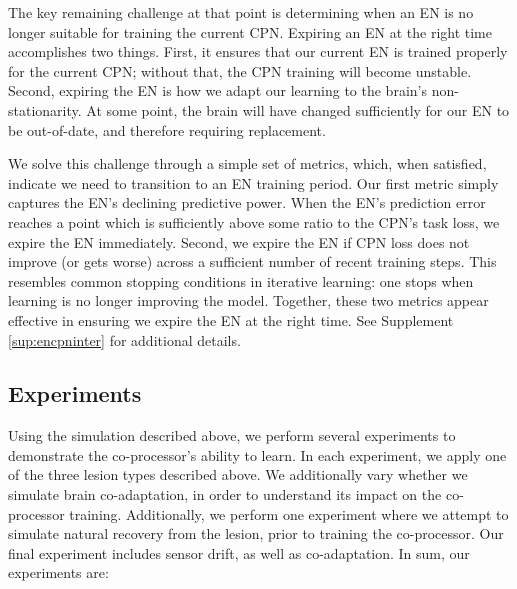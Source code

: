 \documentclass[12pt]{iopart}
\begin{document}
The key remaining challenge at that point is determining when an EN is no longer
suitable for training the current CPN. Expiring an EN at the right time
accomplishes two things. First, it ensures that our current EN is trained properly
for the current CPN; without that, the CPN training will become unstable. Second,
expiring the EN is how we adapt our learning to the brain's non-stationarity.
At some point, the brain will have changed sufficiently for our EN to be
out-of-date, and therefore requiring replacement.

We solve this challenge through a simple set of metrics, which, when satisfied, indicate
we need to transition to an EN training period. Our first metric simply captures the EN's
declining predictive power. When the EN's prediction error reaches a point which is
sufficiently above some ratio to the CPN's task loss, we expire the EN immediately.
Second, we expire the EN if CPN loss does not improve (or gets worse) across a sufficient
number of recent training steps. This resembles common stopping conditions in
iterative learning: one stops when learning is no longer improving the model. Together,
these two metrics appear effective in ensuring we expire the EN at the right time.
See Supplement \ref{sup:encpninter} for additional details.

\subsection{Experiments}
\label{sec:experiments}

Using the simulation described above, we perform several experiments to
demonstrate the co-processor's ability to learn. In each experiment, we apply one
of the three lesion types described above. We additionally vary whether we simulate
brain co-adaptation, in order to understand its impact on the co-processor training.
Additionally, we perform one experiment where we attempt to simulate natural recovery
from the lesion, prior to training the co-processor. Our final experiment includes
sensor drift, as well as co-adaptation. In sum, our experiments are: \\
\end{document}
